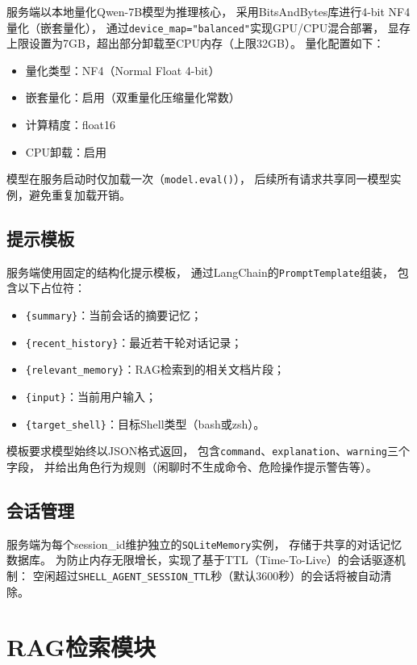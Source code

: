 服务端以本地量化Qwen-7B模型为推理核心，
采用BitsAndBytes库进行4-bit NF4量化（嵌套量化），
通过\texttt{device\_map="balanced"}实现GPU/CPU混合部署，
显存上限设置为7GB，超出部分卸载至CPU内存（上限32GB）。
量化配置如下：

\begin{itemize}
    \item 量化类型：NF4（Normal Float 4-bit）
    \item 嵌套量化：启用（双重量化压缩量化常数）
    \item 计算精度：float16
    \item CPU卸载：启用
\end{itemize}

模型在服务启动时仅加载一次（\texttt{model.eval()}），
后续所有请求共享同一模型实例，避免重复加载开销。

\subsection{提示模板}

服务端使用固定的结构化提示模板，
通过LangChain的\texttt{PromptTemplate}组装，
包含以下占位符：

\begin{itemize}
    \item \texttt{\{summary\}}：当前会话的摘要记忆；
    \item \texttt{\{recent\_history\}}：最近若干轮对话记录；
    \item \texttt{\{relevant\_memory\}}：RAG检索到的相关文档片段；
    \item \texttt{\{input\}}：当前用户输入；
    \item \texttt{\{target\_shell\}}：目标Shell类型（bash或zsh）。
\end{itemize}

模板要求模型始终以JSON格式返回，
包含\texttt{command}、\texttt{explanation}、\texttt{warning}三个字段，
并给出角色行为规则（闲聊时不生成命令、危险操作提示警告等）。

\subsection{会话管理}

服务端为每个session\_id维护独立的\texttt{SQLiteMemory}实例，
存储于共享的对话记忆数据库。
为防止内存无限增长，实现了基于TTL（Time-To-Live）的会话驱逐机制：
空闲超过\texttt{SHELL\_AGENT\_SESSION\_TTL}秒（默认3600秒）的会话将被自动清除。

\section{RAG检索模块}

